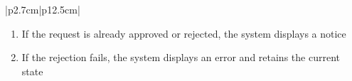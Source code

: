 \begin{table}[H]
\begin{tabular}{|p{2.7cm}|p{12.5cm}|}
\begin{minipage}[t]{\linewidth}
\begin{enumerate}[topsep=0pt,itemsep=1pt,parsep=0pt,partopsep=0pt]
                                          \item If the request is already approved or rejected, the system displays a notice
                                          \item If the rejection fails, the system displays an error and retains the current
                                                state
                                      \end{enumerate}
                                  \end{minipage} \\
        \hline
    \end{tabular}
    \label{tab:admin-reject-vm-assignment}
\end{table}



